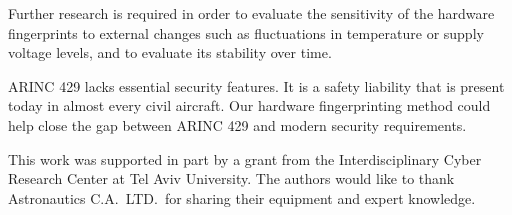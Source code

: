 \documentclass[english]{llncs}
\makeatletter
\newcommand{\enableopenany}{%
  \@openrightfalse%
}
\newcommand{\disableopenany}{%
  \@openrighttrue%
}
\newcommand{\newchapterevenpage}{%
    \enableopenany
    \chapter*{}
    \checkoddpage
    \ifoddpage
      \newpage
    \else
    \fi
    \disableopenany
  }
\makeatother
\begin{document}
  Further research is required in order to evaluate the sensitivity of the hardware fingerprints to external changes such as fluctuations in temperature or supply voltage levels, and to evaluate its stability over time.
  
  ARINC 429 lacks essential security features.
  It is a safety liability that is present today in almost every civil aircraft.
  Our hardware fingerprinting method could help close the gap between ARINC 429 and modern security requirements.

\vspace*{0.5ex}
 This work was supported in part by a grant from the Interdisciplinary Cyber Research Center at Tel Aviv University.
The authors would like to thank Astronautics C.A.\ LTD.\ for sharing their equipment and expert knowledge.

\vspace*{-1ex}

 

\iftoggle{paper}{
}{
  \pagenumbering{gobble}  %
  \pagestyle{empty}
  \newchapterevenpage
  
  \newchapterevenpage
  
  \newchapterevenpage
  
}
\end{document}
